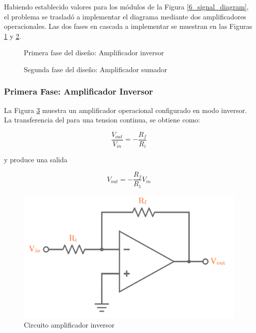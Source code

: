 Habiendo establecido valores para los módulos de la Figura \ref{6_signal_diagram}, el problema se trasladó a implementar el diagrama mediante dos amplificadores operacionales. Las dos fases en cascada a implementar se muestran en las Figuras \ref{6_f1} y \ref{6_f2}.

\begin{figure}[H]
\centering

\caption{Primera fase del diseño: Amplificador inversor}
\label{6_f1}
\end{figure}

\begin{figure}[H]
\centering

\caption{Segunda fase del diseño: Amplificador sumador}
\label{6_f2}
\end{figure}




\subsubsection{Primera Fase: Amplificador Inversor}
La Figura \ref{6_invert_opamp_fig} muestra un amplificador operacional configurado en modo inversor. La transferencia del para una tension continua, se obtiene como:

\[\frac{V_{out}}{V_{in}} = - \frac{R_f}{R_i}\]

y produce una salida

\[V_{out} = -\frac{R_f}{R_1} V_{in}\]

\begin{figure}[H]
\centering
\includegraphics[scale=0.3]{../parte6/Informe/resources/inverting_opamp_diagram.png}
\caption{Circuito amplificador inversor}
\label{6_invert_opamp_fig}
\end{figure}

